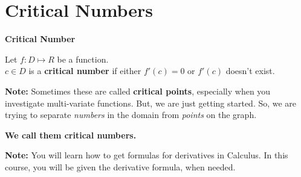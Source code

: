 \documentclass{ximera}
\begin{document}
\section*{Critical Numbers}




\begin{definition} \textbf{\textcolor{green!50!black}{Critical Number}}

Let $f: D \mapsto R$ be a function. \\
$c \in D$ is a \textbf{critical number} if  either $f'(c) = 0$ or $f'(c)$ doesn't exist.


\end{definition}


\textbf{Note:}  Sometimes these are called \textbf{critical points}, especially when you investigate multi-variate functions.  But, we are just getting started.  So, we are trying to separate \textit{numbers} in the domain from \textit{points} on the graph. \\



\begin{center}


\textbf{\textcolor{purple!85!blue}{We call them critical numbers.}}

\end{center}


\textbf{Note:} You will learn how to get formulas for derivatives in Calculus.  In this course, you will be given the derivative formula, when needed. \\
\end{document}
